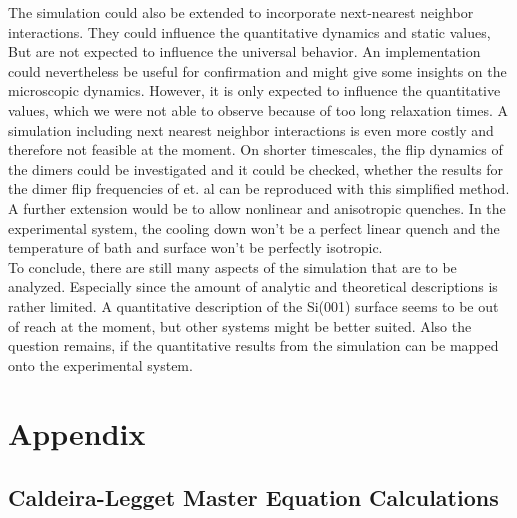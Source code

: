 	The simulation could also be extended to incorporate next-nearest neighbor interactions. They could influence the quantitative dynamics and static values, But are not expected to influence the universal behavior. An implementation could nevertheless be useful for confirmation and might give some insights on the microscopic dynamics. However, it is only expected to influence the quantitative values, which we were not able to observe because of too long relaxation times. A
	simulation including next nearest neighbor interactions is even more costly and therefore not feasible at the moment. On shorter timescales, the flip dynamics of the dimers could be investigated and it could be checked, whether the results for the dimer flip frequencies of \cite{fu2001molecular} et. al can be reproduced with this simplified method. A further extension would be to allow nonlinear and anisotropic quenches. In the experimental system, the cooling down won't be a perfect linear quench and the temperature of bath and surface won't be perfectly isotropic. \\
	
	To conclude, there are still many aspects of the simulation that are to be analyzed. Especially since the amount of analytic and theoretical descriptions is rather limited. A quantitative description of the Si(001) surface seems to be out of reach at the moment, but other systems might be better suited. Also the question remains, if the quantitative results from the simulation can be mapped onto the experimental system.
	
	\appendix
	\chapter{Appendix}
	\section{Caldeira-Legget Master Equation Calculations} \label{Section::Appendix-Caldeira-Legget}
